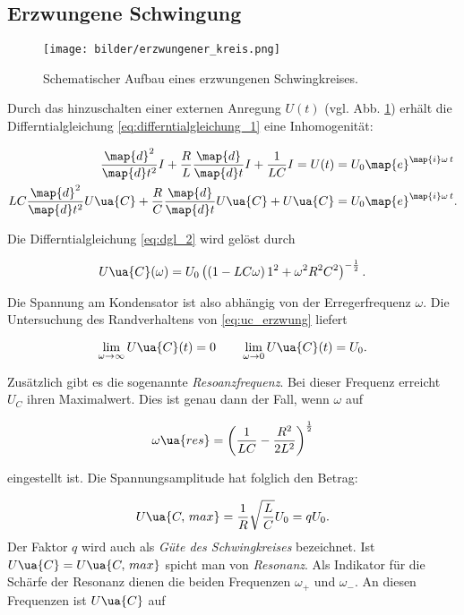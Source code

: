 \subsection{Erzwungene Schwingung}
\begin{figure}
  \centering
  \texttt{[image: bilder/erzwungener\_kreis.png]}
  \caption{Schematischer Aufbau eines erzwungenen Schwingkreises\cite{anleitung354}. }
  \label{fig:erzwungen}
\end{figure}

Durch das hinzuschalten einer externen Anregung $U(t)$ (vgl. Abb. \ref{fig:erzwungen})
erhält die Differntialgleichung \eqref{eq:differntialgleichung_1} eine
Inhomogenität:

\begin{align}
  \frac{\map{d}^2}{\map{d}t^2}I+\frac{R}{L}\frac{\map{d}}{\map{d}t}I+\frac{1}{LC}I=U(t)&=U_0\map{e}^{\map{i}\omega\, t}\notag \\
  LC\frac{\map{d}^2}{\map{d}t^2}U\ua{C}+\frac{R}{C}\frac{\map{d}}{\map{d}t}U\ua{C}+U\ua{C}&=U_0\map{e}^{\map{i}\omega\, t}. \label{eq:dgl_2}
\end{align}

Die Differntialgleichung \eqref{eq:dgl_2} wird gelöst durch

\begin{equation}
  \label{eq:uc_erzwung}
  U\ua{C}(\omega)=U_0\left(\left(1-LC\omega\right)1^2+\omega^2R^2C^2\right)^{-\frac{1}{2}}.
\end{equation}

Die Spannung am Kondensator ist also abhängig von der Erregerfrequenz $\omega$.
Die Untersuchung des Randverhaltens von \eqref{eq:uc_erzwung} liefert

\begin{equation*}
  \lim_{\omega \to \infty} U\ua{C}(t)=0 \qquad \lim_{\omega \to 0} U\ua{C}(t)=U_0.
\end{equation*}

Zusätzlich gibt es die sogenannte \emph{Resoanzfrequenz}.
Bei dieser Frequenz erreicht $U_C$ ihren Maximalwert. Dies ist genau dann der Fall, wenn
$\omega$ auf

\begin{equation*}
  \label{eq:resonanzfrequenz}
  \omega\ua{res}=\left(\frac{1}{LC}-\frac{R^2}{2L^2}\right)^{\frac{1}{2}}
\end{equation*}

eingestellt ist.
Die Spannungsamplitude hat folglich den Betrag:

\begin{equation}
  \label{eq:spann_ampli}
  U\ua{C,\, max}=\frac{1}{R}\sqrt{\frac{L}{C}}U_0=qU_0.
\end{equation}
Der Faktor $q$ wird auch als \emph{Güte des Schwingkreises} bezeichnet.
Ist $U\ua{C}=U\ua{C,\, max}$ spicht man von \emph{Resonanz}.
Als Indikator für die Schärfe der Resonanz dienen die beiden
Frequenzen $\omega_+$ und $\omega_-$. An diesen Frequenzen ist
$U\ua{C}$ auf

